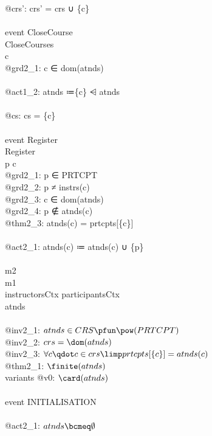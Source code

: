 \begin{description}
\begin{center}
\begin{Bcode}
      @crs': crs' = crs ∪ \{c\}\\
      \Bend\\
      \Bconvergent{} event CloseCourse \\
      \Brefines{} CloseCourses\\
      \Bany{} c \Bwhere\\
      @grd2_1: c ∈ dom(atnds)\\
      \Bthen\\
      @act1_2: atnds ≔\{c\} ⩤ atnds\\
      \Bwith\\
      @cs: cs = \{c\}\\
      \Bend\\
      \Bconvergent{} event Register \\
      \Brefines{} Register\\
      \Bany{} p c \Bwhere\\
      @grd2_1: p ∈ PRTCPT\\
      @grd2_2: p ≠ instrs(c)\\
      @grd2_3: c ∈ dom(atnds)\\
      @grd2_4: p ∉ atnds(c)\\
      \Btheorem{} @thm2_3: atnds(c) = prtcpts[\{c\}]\\
      \Bthen\\
      @act2_1: atnds(c) ≔ atnds(c) ∪ \{p\}\\
      \Bend\\
      \Bend
      \else
      \Bmachine{} m2\\
      \Brefines{} m1\\
      \Bsees{} instructorsCtx participantsCtx\\
      \Bvariables{} atnds\\
      \Binvariants\\
      \Btab @inv2_1: \(atnds \in CRS \pfun \pow(PRTCPT)\)\\
      \Btab @inv2_2: \(crs = \dom(atnds)\)\\
      \Btab @inv2_3: \(\forall c \qdot c \in crs \limp prtcpts[\{c\}] = atnds(c)\)\\
      \Btab \Btheorem{} @thm2_1: \(\finite(atnds)\)\\
      variants @v0: \(\card(atnds)\)\\
      \Bevents\\
      \Btab event INITIALISATION\\
      \Btab \Bthen\\
      \Btab \Btab @act2_1: \(atnds \bcmeq \emptyset\)\\

\end{Bcode}
\end{center}
\end{description}
